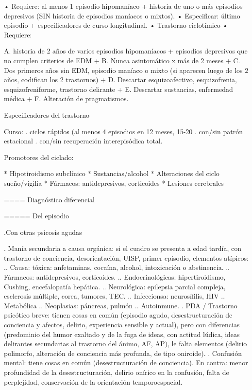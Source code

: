 \documentclass[encares.tex]{subfiles}
\begin{document}
• Requiere: al menos 1 episodio hipomaníaco + historia de uno o más episodios depresivos (SIN historia de episodios maníacos o mixtos).
• Especificar: último episodio + especificadores de curso longitudinal.
• Trastorno ciclotímico
• Requiere:

A. historia de 2 años de varios episodios hipomaníacos + episodios depresivos que no cumplen criterios de EDM +
B. Nunca asintomático x más de 2 meses +
C. Dos primeros años sin EDM, episodio maníaco o mixto (si aparecen luego de los 2 años, codifican los 2 trastornos) +
D. Descartar esquizoafectivo, esquizofrenia, esquizofreniforme, trastorno delirante +
E. Descartar sustancias, enfermedad médica +
F. Alteración de pragmatismos.

Especificadores del trastorno

Curso:
. ciclos rápidos (al menos 4 episodios en 12 meses, 15-20%
. con/sin patrón estacional
. con/sin recuperación interepisódica total.

Promotores del ciclado:

* Hipotiroidismo subclínico
* Sustancias/alcohol
* Alteraciones del ciclo sueño/vigilia
* Fármacos: antidepresivos, corticoides
* Lesiones cerebrales

==== Diagnóstico diferencial

===== Del episodio

.Con otras psicosis agudas

. Manía secundaria a causa orgánica: si el cuadro se presenta a edad tardía, con trastorno de conciencia, desorientación, UISP, primer episodio, elementos atípicos:
.. Causa: tóxica: anfetaminas, cocaína, alcohol, intoxicación o abstinencia.
.. Fármacos: antidepresivos, corticoides.
.. Endocrinológicas: hipertiroidismo, Cushing, encefalopatía hepática.
.. Neurológica: epilepsia parcial compleja, esclerosis múltiple, corea, tumores, TEC.
.. Infeccionsa: neurosífilis, HIV
.. Metabólica
.. Neoplasias: páncreas, pulmón
.. Autoinmune.
. PDA / Trastorno psicótico breve: tienen cosas en común (episodio agudo, desestructuración de conciencia y afectos, delirio, experiencia sensible y actual), pero con diferencias (predominio del humor exaltado y de la fuga de ideas, con actitud lúdica, ideas delirantes secundarias al trastorno del ánimo, AF, AP), le falta elementos (delirio polimorfo, alteración de conciencia más profunda, de tipo oniroide).
. Confusión mental: tiene cosas en común (desestructuración de conciencia). En contra: menor profundidad de la desestructuración, delirio onírico en la confusión, falta de perplejidad, conservación de la orientación temporoespacial.
\end{document}
